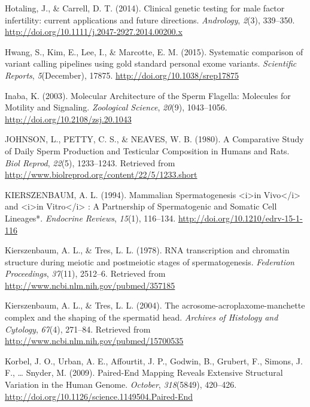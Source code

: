 \documentclass[12pt,twoside]{reedthesis}
\theoremstyle{definition}
\theoremstyle{definition}
\theoremstyle{remark}
\begin{document}
  \hypertarget{ref-Hotaling2014}{}
  Hotaling, J., \& Carrell, D. T. (2014). Clinical genetic testing for
  male factor infertility: current applications and future directions.
  \emph{Andrology}, \emph{2}(3), 339--350.
  \url{http://doi.org/10.1111/j.2047-2927.2014.00200.x}
  
  \hypertarget{ref-Hwang2015}{}
  Hwang, S., Kim, E., Lee, I., \& Marcotte, E. M. (2015). Systematic
  comparison of variant calling pipelines using gold standard personal
  exome variants. \emph{Scientific Reports}, \emph{5}(December), 17875.
  \url{http://doi.org/10.1038/srep17875}
  
  \hypertarget{ref-Inaba2003}{}
  Inaba, K. (2003). Molecular Architecture of the Sperm Flagella:
  Molecules for Motility and Signaling. \emph{Zoological Science},
  \emph{20}(9), 1043--1056. \url{http://doi.org/10.2108/zsj.20.1043}
  
  \hypertarget{ref-Johnson1980}{}
  JOHNSON, L., PETTY, C. S., \& NEAVES, W. B. (1980). A Comparative Study
  of Daily Sperm Production and Testicular Composition in Humans and Rats.
  \emph{Biol Reprod}, \emph{22}(5), 1233--1243. Retrieved from
  \url{http://www.biolreprod.org/content/22/5/1233.short}
  
  \hypertarget{ref-KIERSZENBAUM1994}{}
  KIERSZENBAUM, A. L. (1994). Mammalian Spermatogenesis
  \textless{}i\textgreater{}in Vivo\textless{}/i\textgreater{} and
  \textless{}i\textgreater{}in Vitro\textless{}/i\textgreater{} : A
  Partnership of Spermatogenic and Somatic Cell Lineages*. \emph{Endocrine
  Reviews}, \emph{15}(1), 116--134.
  \url{http://doi.org/10.1210/edrv-15-1-116}
  
  \hypertarget{ref-Kierszenbaum1978}{}
  Kierszenbaum, A. L., \& Tres, L. L. (1978). RNA transcription and
  chromatin structure during meiotic and postmeiotic stages of
  spermatogenesis. \emph{Federation Proceedings}, \emph{37}(11), 2512--6.
  Retrieved from \url{http://www.ncbi.nlm.nih.gov/pubmed/357185}
  
  \hypertarget{ref-Kierszenbaum2004}{}
  Kierszenbaum, A. L., \& Tres, L. L. (2004). The
  acrosome-acroplaxome-manchette complex and the shaping of the spermatid
  head. \emph{Archives of Histology and Cytology}, \emph{67}(4), 271--84.
  Retrieved from \url{http://www.ncbi.nlm.nih.gov/pubmed/15700535}
  
  \hypertarget{ref-Korbel2009}{}
  Korbel, J. O., Urban, A. E., Affourtit, J. P., Godwin, B., Grubert, F.,
  Simons, J. F., \ldots{} Snyder, M. (2009). Paired-End Mapping Reveals
  Extensive Structural Variation in the Human Genome. \emph{October},
  \emph{318}(5849), 420--426.
  \url{http://doi.org/10.1126/science.1149504.Paired-End}
  
\end{document}
